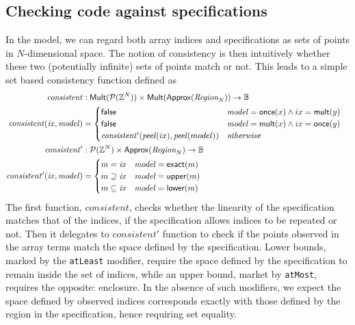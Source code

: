 \subsection{Checking code against specifications}
\label{subsec:checking}
%
In the model, we can regard both array indices and specifications as sets of
points in $N$-dimensional space. The notion of consistency is then intuitively
whether these two (potentially infinite) sets of points match or not.
This leads to a simple set based consistency function defined as
%
\begin{align*}
  \mathit{consistent} & :
    \mathsf{Mult}(\mathcal{P}(\bz{}^N)) \times
    \mathsf{Mult}(\mathsf{Approx}(\region{N})) \to \mathbb{B} & \\
%
  \mathit{consistent}(\mathit{ix}, \mathit{model}) & = \begin{cases}
    \mathsf{false} & \mathit{model} = \mathsf{once}(x) \wedge ix =
    \mathsf{mult}(y) \\
    \mathsf{false} & \mathit{model} = \mathsf{mult}(x) \wedge ix = \mathsf{once}(y) \\
    \mathit{consistent'}(\mathit{peel}(ix), \mathit{peel}(model)) & \textit{otherwise}
  \end{cases} \\
%
  \mathit{consistent'} & :
    \mathcal{P}(\bz{}^N) \times
    \mathsf{Approx}(\region{N}) \to \mathbb{B} & \\
%
  \mathit{consistent'}(\mathit{ix}, \mathit{model}) & = \begin{cases}
    m = \mathit{ix} & \mathit{model} = \mathsf{exact}(m) \\
    m \supseteq \mathit{ix} & \mathit{model} = \mathsf{upper}(m) \\
    m \subseteq \mathit{ix} & \mathit{model} = \mathsf{lower}(m)
  \end{cases}
\end{align*}
%
The first function, $\mathit{consistent}$, checks whether the linearity of the
specification matches that of the indices, \ie{} if the specification allows
indices to be repeated or not. Then it delegates to $\mathit{consistent'}$
function to check if the points observed in the array terms match the space
defined by the specification. Lower bounds, marked by the \texttt{atLeast}
modifier, require the space defined by the specification to remain inside the
set of indices, while an upper bound, market by \texttt{atMost},
requires the opposite: enclosure. In the absence of such modifiers, we expect
the space defined by observed indices corresponds exactly with those defined by the
region in the specification, hence requiring set equality.

